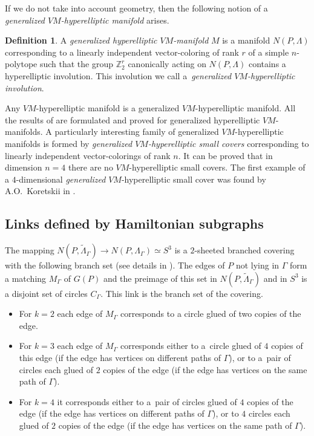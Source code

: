 \documentclass[12pt]{amsart}
\theoremstyle{definition}
\newtheorem{definition}[formula]{Definition}
\theoremstyle{remark}
\begin{document}
If we do not take into account geometry, then the following
notion of a {\it generalized  $VM$-hyperelliptic manifold} arises. 
\begin{definition}\label{def:genvm}
A  {\it generalized hyperelliptic $VM$-manifold} $M$ is a manifold $N(P,\Lambda)$
corresponding to a linearly independent vector-coloring of rank $r$ of a simple $n$-polytope such that the group $\mathbb Z_2^r$
canonically acting on $N(P,\Lambda)$ contains a hyperelliptic involution. This involution we call
a~{\it generalized $VM$-hyperelliptic involution}.
\end{definition} 
Any $VM$-hyperelliptic manifold is a generalized $VM$-hyperelliptic manifold. 
All the results of \cite{E24,E26} are formulated and proved for generalized hyperelliptic $VM$-manifolds.
A particularly interesting family of generalized $VM$-hyperelliptic manifolds is formed
by {\it generalized $VM$-hyperelliptic small covers} corresponding to linearly independent vector-colorings of rank $n$.
It can be proved that in dimension $n=4$ there are no $VM$-hyperelliptic small covers. The first example
of a $4$-dimensional {\it generalized}  $VM$-hyperelliptic small cover was found by A.O.~Koretskii in \cite{K24,K24B}.

\subsection{Links defined by Hamiltonian subgraphs}

The mapping $N(P,\widetilde{\Lambda}_{\Gamma})\to N(P,\Lambda_{\Gamma})\simeq S^3$ is a $2$-sheeted branched covering with the following branch set (see details in \cite[Section 4.5]{E26}).
The edges of $P$ not lying in $\Gamma$ form a matching $M_{\Gamma}$ of  $G(P)$ and the preimage of this set in 
$N(P,\widetilde{\Lambda}_{\Gamma})$ and in $S^3$ is a disjoint set of circles $C_{\Gamma}$. This link is the branch set of the covering. 
\begin{itemize}
\item For $k=2$ each edge of $M_{\Gamma}$ corresponds to a circle glued of two copies of the edge. 
\item For $k=3$ each edge of $M_{\Gamma}$ corresponds either to a~circle glued of $4$ copies of this edge 
(if the edge has vertices on different paths of $\Gamma$), 
or to a~pair of circles each glued of $2$ copies of the edge (if the edge has vertices on the same path of $\Gamma$). 
\item For $k=4$ it corresponds either to a~pair of circles glued of $4$ copies of the edge (if the edge has vertices on different paths of $\Gamma$), or to $4$ circles each glued of $2$ copies of the edge (if the edge has vertices on the same path of $\Gamma$). 
\end{itemize}
\end{document}
